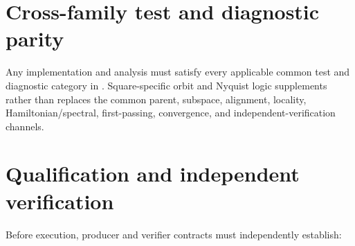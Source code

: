 \documentclass[11pt]{article}
\begin{document}
\section{Cross-family test and diagnostic parity}

Any implementation and analysis must satisfy every applicable common test and
diagnostic category in
.
Square-specific orbit and Nyquist logic supplements rather than replaces the common
parent, subspace, alignment, locality, Hamiltonian/spectral, first-passing, convergence,
and independent-verification channels.

\section{Qualification and independent verification}

Before execution, producer and verifier contracts must independently establish:
\end{document}
